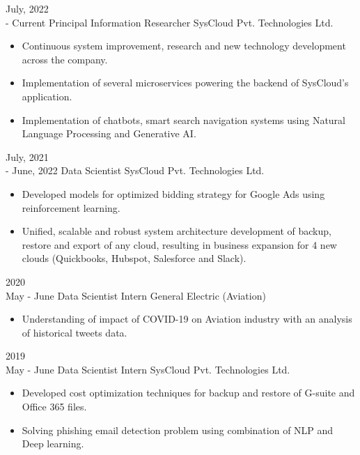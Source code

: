 \documentclass[9pt]{developercv} %
\begin{document}
\begin{entrylist}
    \entry
    {July, 2022\\ - Current}
    {Principal Information Researcher}
    {SysCloud Pvt. Technologies Ltd.}
    {\vspace{-10pt}
        \begin{itemize}[noitemsep,topsep=0pt,parsep=0pt,partopsep=0pt, leftmargin=-1pt]
            \item Continuous system improvement, research and new technology development across the company.
            \item Implementation of several microservices powering the backend of SysCloud's application.
            \item Implementation of chatbots, smart search navigation systems using Natural Language Processing and Generative AI.
        \end{itemize}
    }
    \entry
    {July, 2021\\- June, 2022}
    {Data Scientist}
    {SysCloud Pvt. Technologies Ltd.}
    {\vspace{-10pt}
        \begin{itemize}[noitemsep,topsep=0pt,parsep=0pt,partopsep=0pt, leftmargin=-1pt]
            \item Developed models for optimized bidding strategy for Google Ads using reinforcement learning.
            \item Unified, scalable and robust system architecture development of backup, restore and export of any cloud, resulting in business expansion for 4 new clouds (Quickbooks, Hubspot, Salesforce and Slack).
        \end{itemize}
    }
    \entry
    {2020\\\footnotesize{May - June}}
    {Data Scientist Intern}
    {General Electric (Aviation)}
    {\vspace{-10pt}
        \begin{itemize}[noitemsep,topsep=0pt,parsep=0pt,partopsep=0pt, leftmargin=-1pt]
            \item Understanding of impact of COVID-19 on Aviation industry with an analysis of historical tweets data.
        \end{itemize}
    }
    \entry
    {2019\\\footnotesize{May - June}}
    {Data Scientist Intern}
    {SysCloud Pvt. Technologies Ltd.}
    {\vspace{-10pt}
        \begin{itemize}[noitemsep,topsep=0pt,parsep=0pt,partopsep=0pt, leftmargin=-1pt]
            \item Developed cost optimization techniques for backup and restore of G-suite and Office 365 files.
            \item Solving phishing email detection problem using combination of NLP and Deep learning.
        \end{itemize}
    }
\end{entrylist}
\end{document}
